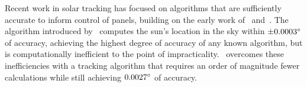 \documentclass{article}
\begin{document}
\begin{figure}[b!]
\label{fig:solar}
\end{figure}

Recent work in solar tracking has focused on algorithms that are sufficiently accurate to inform control of panels, building on the early work of~\citet{spencer1971fourier,walraven1978calculating} and~\citet{michalsky1988astronomical}. The algorithm introduced by~\citet{reda2004solar} computes the sun's location in the sky within $\pm 0.0003\degree$ of accuracy, achieving the highest degree of accuracy of any known algorithm, but is computationally inefficient to the point of impracticality.~\citet{Grena2008} overcomes these inefficiencies with a tracking algorithm that requires an order of magnitude fewer calculations while still achieving $0.0027\degree$ of accuracy.
\end{document}
